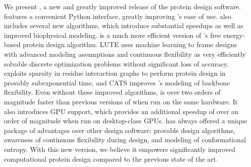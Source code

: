 We present , a new and greatly improved release of the \osprey protein design software.   features a convenient Python interface, greatly improving \osprey's ease of use.   also includes several new algorithms, which introduce substantial speedups as well as improved biophysical modeling.  \bbks is a much more efficient version of \osprey's \ks free energy-based protein design algorithm.  LUTE uses machine learning to frame designs with advanced modeling assumptions and continuous flexibility as very efficiently solvable discrete optimization problems without significant loss of accuracy.  \bwmstar exploits sparsity in residue interaction graphs to perform protein design in provably subexponential time, and CATS improves \osprey's modeling of backbone flexibility.  Even without these improved algorithms,  is over two orders of magnitude faster than previous versions of \osprey when run on the same hardware.  It also introduces GPU support, which provides an additional speedup of over an order of magnitude when run on desktop-class GPUs.  \osprey has always offered a unique package of advantages over other design software: provable design algorithms, awareness of continuous flexibility during design, and modeling of conformational entropy.  With this new version, we believe it empowers significantly improved computational protein design compared to the previous state of the art.  